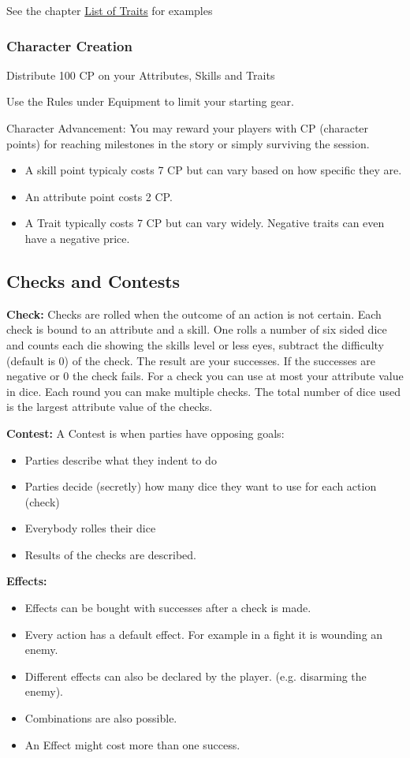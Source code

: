 \documentclass[11pt]{article}
\begin{document}
{\begin{multicols}{2}[]
See the chapter \hyperref[sec:org683491f]{List of Traits} for examples

\subsubsection{Character Creation}
\label{sec:org3e1b291}
Distribute 100 CP on your Attributes, Skills and Traits

Use the Rules under Equipment to limit your starting gear.

Character Advancement:
You may reward your players with CP (character points) for reaching milestones in the story or simply surviving the session.

\begin{itemize}
\item A skill point typicaly costs 7 CP but can vary based on how specific they are.
\item An attribute point costs 2 CP.
\item A Trait typically costs 7 CP but can vary widely. Negative traits can even have a negative price.
\end{itemize}

\subsection{Checks and Contests}
\label{sec:orga4d7be5}
\textbf{Check:}
Checks are rolled when the outcome of an action is not certain. Each check is bound to an attribute and a skill. One rolls a number of six sided dice and counts each die showing the skills level or less eyes, subtract the difficulty (default is 0) of the check. The result are your successes. If the successes are negative or 0 the check fails. For a check you can use at most your attribute value in dice.
Each round you can make multiple checks. The total number of dice used is the largest attribute value of the checks. 

\textbf{Contest:}
A Contest is when parties have opposing goals:
\begin{itemize}
\item Parties describe what they indent to do
\item Parties decide (secretly) how many dice they want to use for each action (check)
\item Everybody rolles their dice
\item Results of the checks are described.
\end{itemize}

\textbf{Effects:}
\begin{itemize}
\item Effects can be bought with successes after a check is made.
\item Every action has a default effect. For example in a fight it is wounding an enemy.
\item Different effects can also be declared by the player. (e.g. disarming the enemy).
\item Combinations are also possible.
\item An Effect might cost more than one success.
\end{itemize}


\end{multicols}}
\end{document}
